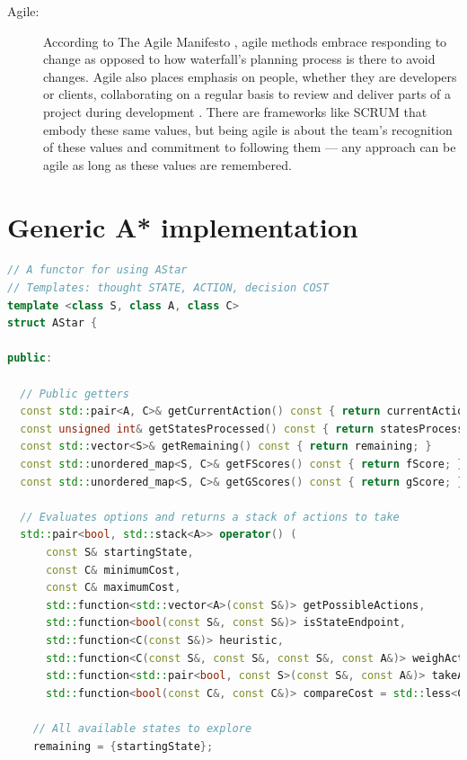 \documentclass[11pt, a4paper]{report}
\begin{document}
\begin{appendices}
\begin{description}
  \item[Agile:] According to The Agile Manifesto \parencite[2]{fowler2001agile}, agile methods embrace responding to change as opposed to how waterfall's planning process is there to avoid changes. Agile also places emphasis on people, whether they are developers or clients, collaborating on a regular basis to review and deliver parts of a project during development \parencite[3]{fowler2001agile}. There are frameworks like SCRUM \parencite[1]{fowler2001agile} that embody these same values, but being agile is about the team's recognition of these values and commitment to following them --- any approach can be agile as long as these values are remembered.

\end{description}

\chapter{Generic A* implementation}
\label{appendix:genericAStarImplementation}

\linespread{0.8}
\begin{lstlisting}[language=C++]
// A functor for using AStar
// Templates: thought STATE, ACTION, decision COST
template <class S, class A, class C>
struct AStar {

public:

  // Public getters
  const std::pair<A, C>& getCurrentAction() const { return currentAction; }
  const unsigned int& getStatesProcessed() const { return statesProcessed; }
  const std::vector<S>& getRemaining() const { return remaining; }
  const std::unordered_map<S, C>& getFScores() const { return fScore; }
  const std::unordered_map<S, C>& getGScores() const { return gScore; }

  // Evaluates options and returns a stack of actions to take
  std::pair<bool, std::stack<A>> operator() (
      const S& startingState,
      const C& minimumCost,
      const C& maximumCost,
      std::function<std::vector<A>(const S&)> getPossibleActions,
      std::function<bool(const S&, const S&)> isStateEndpoint,
      std::function<C(const S&)> heuristic,
      std::function<C(const S&, const S&, const S&, const A&)> weighAction,
      std::function<std::pair<bool, const S>(const S&, const A&)> takeAction,
      std::function<bool(const C&, const C&)> compareCost = std::less<C>()) {

    // All available states to explore
    remaining = {startingState};


\end{lstlisting}
\end{appendices}
\end{document}
